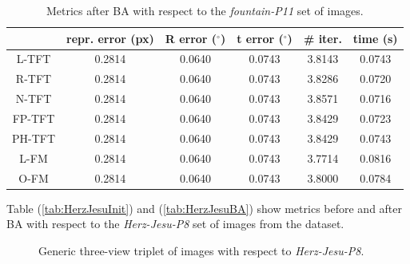 \begin{table}[htbp]
  \centering
  \caption[\textit{fountain-P11} Metrics with \acs{BA}]{Metrics after \acs{BA} with respect to the \textit{fountain-P11} set of images.}
  \label{tab:fountainBA}
  \begin{tabular}{|*{6}{c}|}
    \hline
     & repr. error (px) & R error ($^{\circ}$) & t error ($^{\circ}$) & \# iter. & time (s)\\
     \hline
    \acs{L-TFT} & 0.2814 & 0.0640 & 0.0743 & 3.8143 & 0.0743 \\
    \acs{R-TFT} & 0.2814 & 0.0640 & 0.0743 & 3.8286 & 0.0720 \\
    \acs{N-TFT} & 0.2814 & 0.0640 & 0.0743 & 3.8571 & 0.0716 \\
    \acs{FP-TFT} & 0.2814 & 0.0640 & 0.0743 & 3.8429 & 0.0723 \\
    \acs{PH-TFT} & 0.2814 & 0.0640 & 0.0743 & 3.8429 & 0.0743 \\
    \acs{L-FM} & 0.2814 & 0.0640 & 0.0743 & 3.7714 & 0.0816 \\
    \acs{O-FM} & 0.2814 & 0.0640 & 0.0743 & 3.8000 & 0.0784 \\
    \hline
  \end{tabular}
\end{table}

\pagebreak

Table (\ref{tab:HerzJesuInit}) and (\ref{tab:HerzJesuBA}) show metrics before and after \acs{BA} with respect to the \textit{Herz-Jesu-P8} set of images from the dataset.

\begin{figure}[h]
    \centering
    \caption[\textit{Herz-Jesu-P8} Triplet]{Generic three-view triplet of images with respect to \textit{Herz-Jesu-P8}. \cite{13-epfl-dataset}}
    \label{fig:herzjesuImage}
\end{figure}


